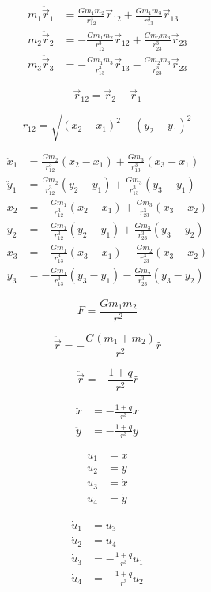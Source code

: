 \documentclass[a4paper,twoside,12pt,hidelinks]{article}
\begin{document}
\thispagestyle{empty}


\begin{align*}
  m_1 \ddot{\vec{r}}_1 & = \frac{G m_1 m_2}{r^3_{12}} \vec{r}_{12} + \frac{G m_1 m_3}{r^3_{13}} \vec{r}_{13} \\
  m_2 \ddot{\vec{r}}_2 & = - \frac{G m_1 m_2}{r^3_{12}} \vec{r}_{12} + \frac{G m_2 m_3}{r^3_{23}} \vec{r}_{23} \\
  m_3 \ddot{\vec{r}}_3 & = - \frac{G m_1 m_3}{r^3_{13}} \vec{r}_{13} - \frac{G m_2 m_3}{r^3_{23}} \vec{r}_{23}
\end{align*}

\[
  \vec{r}_{12} = \vec{r}_{2} - \vec{r}_{1}
\]

\[
  r_{12} = \sqrt{ (x_2 - x_1)^2 - (y_2 - y_1)^2 }
\]

\begin{align*}
  \ddot{x}_1 & = \frac{G m_2}{r^3_{12}} (x_2 - x_1)  + \frac{G m_3}{r^3_{13}} (x_3 - x_1) \\
  \ddot{y}_1 & = \frac{G m_2}{r^3_{12}} (y_2 - y_1)  + \frac{G m_3}{r^3_{13}} (y_3 - y_1) \\
  \ddot{x}_2 & = - \frac{G m_1}{r^3_{12}} (x_2 - x_1) + \frac{G m_3}{r^3_{23}} (x_3 - x_2) \\
  \ddot{y}_2 & = - \frac{G m_1}{r^3_{12}} (y_2 - y_1) + \frac{G m_3}{r^3_{23}} (y_3 - y_2) \\
  \ddot{x}_3 & = - \frac{G m_1 }{r^3_{13}} (x_3 - x_1) - \frac{G m_2}{r^3_{23}} (x_3 - x_2) \\
  \ddot{y}_3 & = - \frac{G m_1 }{r^3_{13}} (y_3 - y_1) - \frac{G m_2}{r^3_{23}} (y_3 - y_2)
\end{align*}



\begin{equation*}
  F = \frac{G m_1 m_2}{r^2}
\end{equation*}


\begin{equation*}
  \ddot{\vec{r}} = - \frac{G (m_1 + m_2)}{r^2} \hat{r}
\end{equation*}

\begin{equation*}
  \ddot{\vec{r}} = - \frac{1 + q}{r^2} \hat{r}
\end{equation*}

\begin{align*}
  \ddot{x} &= - \frac{1 + q}{r^3} x \\
  \ddot{y} &= - \frac{1 + q}{r^3} y
\end{align*}


\begin{align*}
  u_1 &= x \\
  u_2 &= y \\
  u_3 &= \dot{x} \\
  u_4 &= \dot{y}
\end{align*}


\begin{align*}
  \dot{u}_1 &= u_3 \\
  \dot{u}_2 &= u_4 \\
  \dot{u}_3 &= - \frac{1 + q}{r^3} u_1 \\
  \dot{u}_4 &= - \frac{1 + q}{r^3} u_2
\end{align*}
\end{document}

